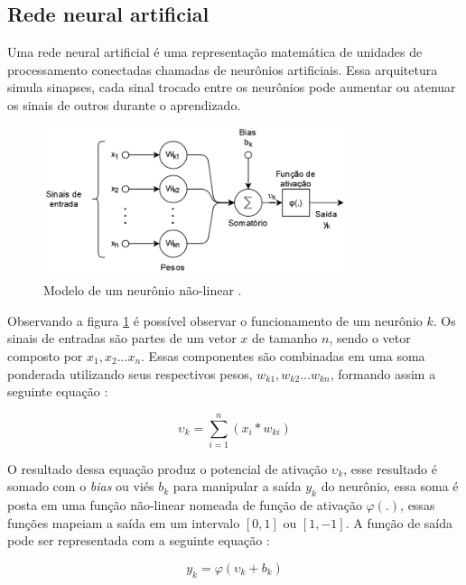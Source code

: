 \subsection{Rede neural artificial}

Uma rede neural artificial é uma representação matemática de unidades de processamento conectadas chamadas de neurônios artificiais. Essa arquitetura simula sinapses, cada sinal trocado entre os neurônios pode aumentar ou atenuar os sinais de outros durante o aprendizado\cite{ml_and_dp}.
\begin{figure}[H]
	\centering
	\includegraphics[width=0.8\textwidth]{figures/neuronio.png}
	\caption{Modelo de um neurônio não-linear \cite{haykin1999neural}.}
	\label{fig:neuronio}
\end{figure}

Observando a figura \ref{fig:neuronio} é possível observar o funcionamento de um neurônio $k$. Os sinais de entradas são partes de um vetor $x$ de tamanho $n$, sendo o vetor composto por $x_1, x_2 ... x_n$. Essas componentes são combinadas em uma soma ponderada utilizando seus respectivos pesos, $w_{k1}, w_{k2}...w_{kn}$, formando assim a seguinte equação  :

\begin{equation}
	\upsilon_k = \sum_{i=1}^n (x_i * w_{ki})
\end{equation}

O resultado dessa equação produz o potencial de ativação $\upsilon_k$, esse resultado é somado com o \textit{bias} ou viés $b_k$ para manipular a saída $y_k$ do neurônio, essa soma é posta em uma função não-linear nomeada de função de ativação $\varphi(.)$, essas funções mapeiam a saída em um intervalo $[0, 1]$ ou $[1, -1]$. A função de saída pode ser representada com a seguinte equação :

\begin{equation}
	y_k = \varphi(\upsilon_k + b_k)
\end{equation}

